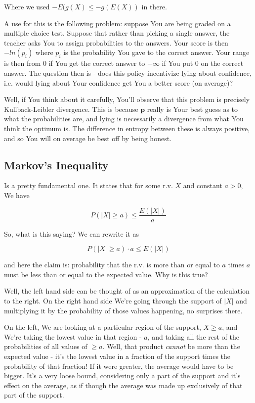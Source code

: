 \documentclass{article}
\begin{document}
		Where we used $-E(g(X) \le -g(E(X))$ in there. 
		
		A use for this is the following problem: suppose You are being graded on a multiple choice test. Suppose that rather than picking a single answer, the teacher asks You to assign probabilities to the answers. Your score is then $-ln(p_i)$ where $p_i$ is the probability You gave to the correct answer. Your range is then from $0$ if You get the correct answer to $-\infty$ if You put 0 on the correct answer. The question then is - does this policy incentivize lying about confidence, i.e. would lying about Your confidence get You a better score (on average)?
		
		Well, if You think about it carefully, You'll observe that this problem is precisely Kullback-Leibler divergence. This is because $\bm{p}$ really is Your best guess as to what the probabilities are, and lying is necessarily a divergence from what You think the optimum is. The difference in entropy between these is always positive, and so You will on average be best off by being honest.
			
	\subsection{Markov's Inequality}
	
		Is a pretty fundamental one. It states that for some r.v. $X$ and constant $a>0$, We have
		
		\[  P(|X|\ge a) \le \frac{E(|X|)}{a} \]
			
		So, what is this saying? We can rewrite it as 
		
		\[P(|X|\ge a)\cdot a\le E(|X|)\]
		
		and here the claim is: probability that the r.v. is more than or equal to $a$ times $a$ must be less than or equal to the expected value. Why is this true? 
		
		Well, the left hand side can be thought of as an approximation of the calculation to the right. On the right hand side We're going through the support of $|X|$ and multiplying it by the probability of those values happening, no surprises there. 
		
		On the left, We are looking at a particular region of the support, $X\ge a$, and We're taking the lowest value in that region - $a$, and taking all the rest of the probabilities of all values of $\ge a$.  Well, that product \textit{cannot} be more than the expected value - it's the lowest value in a fraction of the support times the probability of that fraction! If it were greater, the average would have to be bigger. It's a very loose bound, considering only a part of the support and it's effect on the average, as if though the average was made up exclusively of that part of the support.
		
\end{document}
